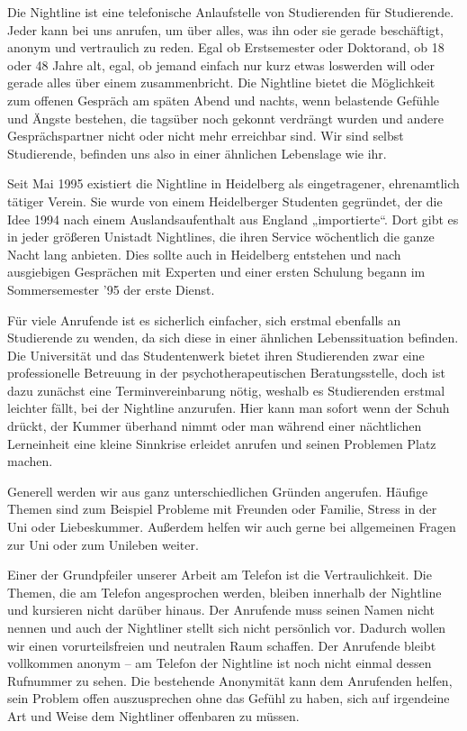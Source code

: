 \newpage
{}%
Die Nightline ist eine telefonische Anlaufstelle von Studierenden für Studierende. Jeder kann bei uns anrufen, um über alles, was ihn oder sie gerade beschäftigt, anonym und vertraulich zu reden. Egal ob Erstsemester oder Doktorand, ob 18 oder 48 Jahre alt, egal, ob jemand einfach nur kurz etwas loswerden will oder gerade alles über einem zusammenbricht. Die Nightline bietet die Möglichkeit zum offenen Gespräch am späten Abend und nachts, wenn belastende Gefühle und Ängste bestehen, die tagsüber noch gekonnt verdrängt wurden und andere Gesprächspartner nicht oder nicht mehr erreichbar sind. Wir sind selbst Studierende, befinden uns also in einer ähnlichen Lebenslage wie ihr.


Seit Mai 1995 existiert die Nightline in Heidelberg als eingetragener, ehrenamtlich tätiger Verein. Sie wurde von einem Heidelberger Studenten gegründet, der die Idee 1994 nach einem Auslandsaufenthalt aus England „importierte“. Dort gibt es in jeder größeren Unistadt Nightlines, die ihren Service wöchentlich die ganze Nacht lang anbieten. Dies sollte auch in Heidelberg entstehen und nach ausgiebigen Gesprächen mit Experten und einer ersten Schulung begann im Sommersemester '95 der erste Dienst.

Für viele Anrufende ist es sicherlich einfacher, sich erstmal ebenfalls an Studierende zu wenden, da sich diese in einer ähnlichen Lebenssituation befinden. Die Universität und das Studentenwerk bietet ihren Studierenden zwar eine professionelle Betreuung in der psychotherapeutischen Beratungsstelle, doch ist dazu zunächst eine Terminvereinbarung nötig, weshalb es Studierenden erstmal leichter fällt, bei der Nightline anzurufen. Hier kann man sofort wenn der Schuh drückt, der Kummer überhand nimmt oder man während einer nächtlichen Lerneinheit eine kleine Sinnkrise erleidet anrufen und seinen Problemen Platz machen.

Generell werden wir aus ganz unterschiedlichen Gründen angerufen. Häufige Themen sind zum Beispiel Probleme mit Freunden oder Familie, Stress in der Uni oder Liebeskummer. Außerdem helfen wir auch gerne bei allgemeinen Fragen zur Uni oder zum Unileben weiter.

Einer der Grundpfeiler unserer Arbeit am Telefon ist die Vertraulichkeit. Die Themen, die am Telefon angesprochen werden, bleiben innerhalb der Nightline und kursieren nicht darüber hinaus. Der Anrufende muss seinen Namen nicht nennen und auch der Nightliner stellt sich nicht persönlich vor. Dadurch wollen wir einen vorurteilsfreien und neutralen Raum schaffen. Der Anrufende bleibt vollkommen anonym – am Telefon der Nightline ist noch nicht einmal dessen Rufnummer zu sehen. Die bestehende Anonymität kann dem Anrufenden helfen, sein Problem offen auszusprechen ohne das Gefühl zu haben, sich auf irgendeine Art und Weise dem Nightliner offenbaren zu müssen.


